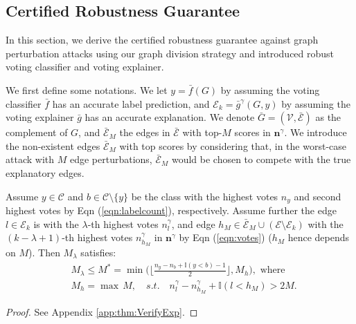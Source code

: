 \subsection{Certified Robustness Guarantee}
\label{sec:Certify}
In this section, we derive the certified robustness guarantee against graph perturbation attacks using our graph division strategy and introduced robust voting classifier and voting explainer. 

We first define some notations. We let $y = \bar{f}(G)$ by assuming the voting classifier $\bar{f}$ has an accurate label prediction, and $\mathcal{E}_k = \bar{g}^{\gamma}(G,y)$ by assuming the voting explainer $\bar{g}$  has an accurate explanation.  
We denote $\bar{G} = (\mathcal{V}, \bar{\mathcal{E}})$ as the complement of $G$, and $\bar{\mathcal{E}}_M$ the edges  in $\bar{\mathcal{E}}$ with top-$M$ scores in $\textbf{n}^{\gamma}$. 
{We introduce the non-existent edges $\bar{\mathcal{E}}_M$ with top scores by considering that, in the worst-case attack with $M$ edge perturbations, $\bar{\mathcal{E}}_{M}$ would be chosen to compete with the true explanatory edges.} 


\begin{theorem}
\label{thm:VerifyExp} 
Assume $y \in \mathcal{C}$ and ${b} \in \mathcal{C} \setminus \{y\}$ be the class with the highest votes $n_y$ and second highest votes by Eqn (\ref{eqn:labelcount}), respectively. 
 Assume further the edge $l \in \mathcal{E}_k$ is with the $\lambda$-th highest votes $n_{l}^{\gamma}$, and edge $h_M \in \bar{\mathcal{E}}_M \cup (\mathcal{E} \setminus \mathcal{E}_k)$ with the $(k-\lambda+1)$-th highest votes ${n}_{h_M}^{\gamma}$ in ${\textbf{n}}^{\gamma}$ by Eqn (\ref{eqn:votes}) ($h_M$ hence depends on $M$). Then $M_{\lambda}$ satisfies: 
\begin{align}
\label{eqn:CPS}
& M_\lambda \leq M^*= \min \big( \lfloor \frac{n_y-n_{b} + \mathbb{I}(y<b)-1}{2} \rfloor, M_h), \textrm{ where } \\ 
& M_h = \max \, M,  \quad {s.t.} \quad {n}_{l}^\gamma- {n}_{h_M}^\gamma + \mathbb{I}(l<h_M) > 2M. \label{Eq:ExpCondition}
\end{align}

\vspace{-4mm}
\end{theorem}
\begin{proof}
See Appendix \ref{app:thm:VerifyExp}. 
\vspace{-2mm}
\end{proof}

